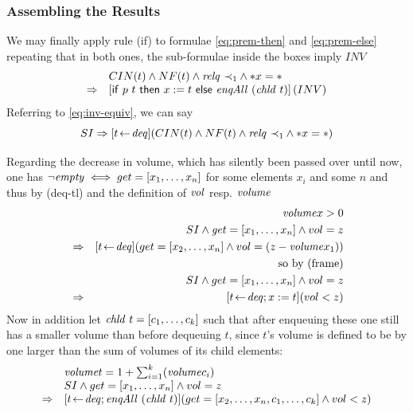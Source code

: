 \subsubsection{Assembling the Results}

We may finally apply rule (if) to formulae \eqref{eq:prem-then} and
\eqref{eq:prem-else} repeating that in both ones, the sub-formulae inside the
boxes imply $INV$
\begin{equation}
\label{eq:concl-if}
\begin{array}{l@{\quad}l}
&  CIN(t) \land NF(t) \land \relq~{\prec}_1 \land \rd{x} =  \unit \\
\Rightarrow & \PDLBox{\IfTerm{p\ t}{x:=t}{\enqAll~(\chld\ t)}}(INV)
\end{array}
\end{equation}
Referring to \eqref{eq:inv-equiv}, we can say
\begin{equation}
\label{eq:si-deq}
SI \Rightarrow [t \!\gets\! \mathit{deq}](CIN(t) \land NF(t) \land \mathit{relq}~{\prec}_1 \land {\ast x} =  \ast )
\end{equation}

Regarding the decrease in volume, which has silently been passed over until now,
one has $\lnot \mathit{empty} \iff get = [x_1,\ldots,x_n]$ for some elements $x_i$ and some $n$ and
thus by (deq-tl) and the definition of $\mathit{vol}$ resp. $\mathit{volume}$
\begin{eqnarray}
\label{eq:then-vol}
&& \mathit{volume} x > 0 \nonumber \\
&& SI \land \mathit{get} = [x_1,\ldots,x_n] \land vol = z \nonumber \\ {}
& \Rightarrow &[t \!\gets\! \mathit{deq}](get = [x_2,\ldots,x_n] \land vol = (z - \mathit{volume} x_1))
    \nonumber \\
&& \text{so by (frame)} \nonumber\\
& & SI \land get = [x_1,\ldots,x_n] \land vol = z \\
&\Rightarrow& [t \!\gets\! \mathit{deq}; x:= t](vol < z) \nonumber
\end{eqnarray}
Now in addition let $\mathit{chld}~t = [c_1,\ldots,c_k]$ such that after enqueuing these one
still has a smaller volume than before dequeuing $t$, since $t$'s volume is
defined to be by one larger than the sum of volumes of its child elements:
\begin{equation}
\label{eq:else-vol}
\begin{array}{ll}
& \mathit{volume} t = 1 + \sum_{i=1}^{k}(\mathit{volume} c_i)\\
& SI \land get = [x_1,\ldots,x_n] \land vol = z \\
\Rightarrow & [t \!\gets\! \mathit{deq}; \mathit{enqAll}~(\mathit{chld}~t)](get = [x_2,\ldots,x_n,c_1,\ldots,c_k] \land vol < z)
\end{array}
\end{equation}

